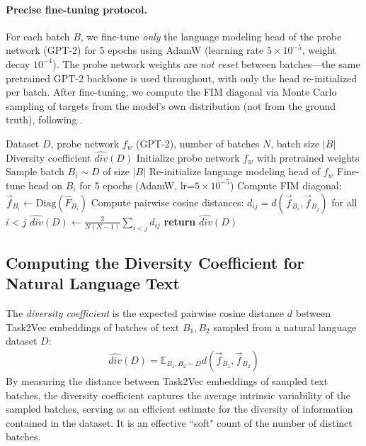 \paragraph{Precise fine-tuning protocol.}
For each batch $B$, we fine-tune \textit{only} the language modeling head of the probe network (GPT-2) for 5 epochs using AdamW (learning rate $5 \times 10^{-5}$, weight decay $10^{-4}$).
The probe network weights are \textit{not reset} between batches---the same pretrained GPT-2 backbone is used throughout, with only the head re-initialized per batch.
After fine-tuning, we compute the FIM diagonal via Monte Carlo sampling of targets from the model's own distribution (not from the ground truth), following \citet{task2vec}.

\begin{algorithm}[h]
\caption{Computing the Diversity Coefficient}\label{alg:div_coeff}
\begin{algorithmic}[1]
\REQUIRE Dataset $D$, probe network $f_w$ (GPT-2), number of batches $N$, batch size $|B|$
\ENSURE Diversity coefficient $\hat{div}(D)$
\STATE Initialize probe network $f_w$ with pretrained weights
    \STATE Sample batch $B_i \sim D$ of size $|B|$
    \STATE Re-initialize language modeling head of $f_w$
    \STATE Fine-tune head on $B_i$ for 5 epochs (AdamW, lr=$5 \times 10^{-5}$)
    \STATE Compute FIM diagonal: $\vec{f}_{B_i} \leftarrow \text{Diag}(\hat{F}_{B_i})$
\ENDFOR
\STATE Compute pairwise cosine distances: $d_{ij} = d(\vec{f}_{B_i}, \vec{f}_{B_j})$ for all $i < j$
\STATE $\hat{div}(D) \leftarrow \frac{2}{N(N-1)} \sum_{i<j} d_{ij}$
\STATE \textbf{return} $\hat{div}(D)$
\end{algorithmic}
\end{algorithm}

\subsection{Computing the Diversity Coefficient for Natural Language Text}
\label{body:div_coeff_natural_lang}
The \textit{diversity coefficient} is the expected pairwise cosine distance $d$ between Task2Vec embeddings of batches of text $B_1, B_2$ sampled from a natural language dataset $D$:
\begin{equation*}
\begin{aligned}
    \hat{div}(D) =
    \mathbb{E}_{B_1, B_2 \sim D} 
     d( \vec{f}_{B_1}, \vec{f}_{B_2} )
\end{aligned}
\end{equation*}
By measuring the distance between Task2Vec embeddings of sampled text batches, the diversity coefficient captures the average intrinsic variability of the sampled batches, serving as an efficient estimate for the diversity of information contained in the dataset. 
It is an effective ``soft" count of the number of distinct batches. 

